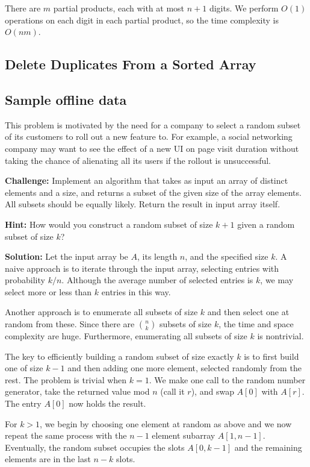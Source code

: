 \documentclass[11pt,a4paper]{article}
\begin{document}
There are $m$ partial products, each with at most $n + 1$ digits. We perform
$O(1)$ operations on each digit in each partial product, so the time
complexity is $O(nm)$.

\subsection{Delete Duplicates From a Sorted Array}

\subsection{Sample offline data}\label{sec:offlinedata}

This problem is motivated by the need for a company to select a random subset
of its customers to roll out a new feature to. For example, a social
networking company may want to see the effect of a new UI on page visit
duration without taking the chance of alienating all its users if the rollout
is unsuccessful.

\textbf{Challenge:} Implement an algorithm that takes as input an array of
distinct elements and a size, and returns a subset of the given size of the
array elements. All subsets should be equally likely. Return the result in
input array itself.

\textbf{Hint:} How would you construct a random subset of size $k + 1$ given a
random subset of size $k$?

\textbf{Solution:} Let the input array be $A$, its length $n$, and the
specified size $k$. A naive approach is to iterate through the input array,
selecting entries with probability $k/n$. Although the average number of
selected entries is $k$, we may select more or less than $k$ entries in this
way.

Another approach is to enumerate all subsets of size $k$ and then select one
at random from these. Since there are $\binom{n}{k}$ subsets of size $k$, the
time and space complexity are huge. Furthermore, enumerating all subsets of
size $k$ is nontrivial.

The key to efficiently building a random subset of size exactly $k$ is to
first build one of size $k - 1$ and then adding one more element, selected
randomly from the rest. The problem is trivial when $k = 1$. We make one call
to the random number generator, take the returned value mod $n$ (call it $r$),
and swap $A[0]$ with $A[r]$. The entry $A[0]$ now holds the result.

For $k > 1$, we begin by choosing one element at random as above and we now
repeat the same process with the $n - 1$ element subarray $A[1,n - 1]$.
Eventually, the random subset occupies the slots $A[0, k - 1]$ and the
remaining elements are in the last $n - k$ slots.
\end{document}
